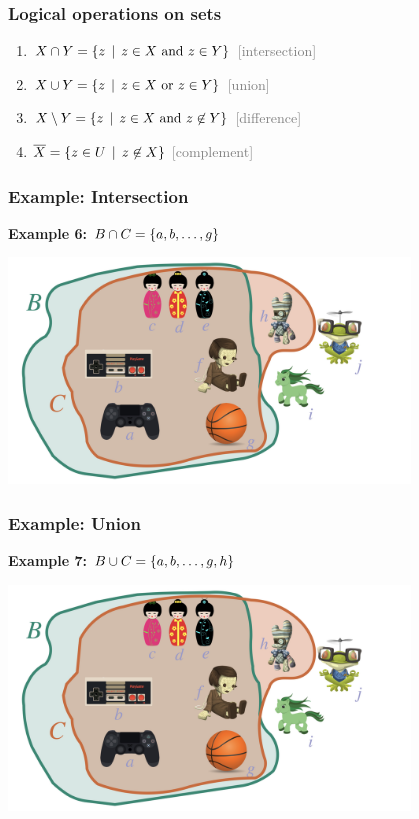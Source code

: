 \documentclass[fleqn,10pt,serif,xcolor=svgnames,xcolor=table,aspectratio=169,handout]{beamer}
\newcommand{\mygray}[1]{\textcolor{gray}{#1}}
\begin{document}
\begin{frame}
  \frametitle{Logical operations on sets}
\begin{enumerate}[]
\item $X \cap Y = \left\{z \thinspace \mid \thinspace z \in X \text{ and } z \in Y\right\}$ \hfill \mygray{[intersection]}
\item $X \cup Y = \left\{z \thinspace \mid \thinspace z \in X \text{ or } z \in Y\right\}$ \hfill \mygray{[union]}
\item $X \setminus Y = \left\{z \thinspace \mid \thinspace z \in X \text{ and } z \not \in Y\right\}$ \hfill
  \mygray{[difference]}
\item $\overline{X} = \left\{z \in U \thinspace \mid \thinspace z \not \in X \right\}$ \hfill
  \mygray{[complement]}
\end{enumerate}

\end{frame}

\begin{frame}
  \frametitle{Example: Intersection}

  \hfill \textbf{Example 6: $B \cap C = \left\{a, b , \dots, g\right\}$}

  \bigskip

  \hfill \includegraphics[width = 0.8\textwidth]{01b-sets-relations-operations/01b-sets-relations-operations-002.jpeg}

\end{frame}

\begin{frame}
  \frametitle{Example: Union}

  \hfill \textbf{Example 7: $B \cup C = \left\{a, b , \dots, g, h\right\}$}

  \bigskip

  \hfill \includegraphics[width = 0.8\textwidth]{01b-sets-relations-operations/01b-sets-relations-operations-002.jpeg}

\end{frame}
\end{document}
